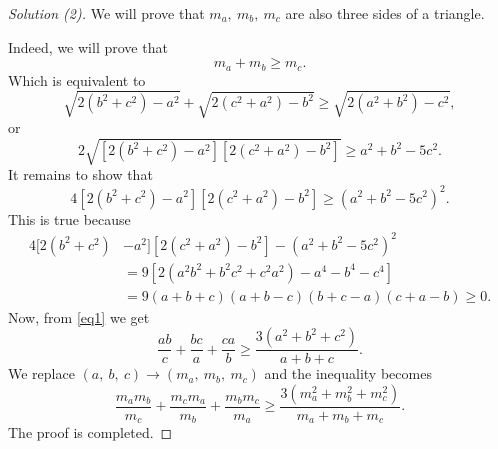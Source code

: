 \documentclass[12pt,a4paper]{book}
\begin{document}

\begin{proof}[\cmss\problemColor Solution (2)]
We will prove that $m_a, \ m_b, \ m_c$ are also three sides of a triangle. 

Indeed, we will prove that
\[m_a + m_b \geqslant m_c.\]
Which is equivalent to
\[\sqrt{2(b^2+c^2)-a^2} +\sqrt{2(c^2+a^2)-b^2}\geqslant \sqrt{2(a^2+b^2)-c^2},\]
or
\[2\sqrt{[2(b^2+c^2)-a^2][2(c^2+a^2)-b^2]} \ge a^2+b^2-5c^2.\]
It remains to show that
\[4[2(b^2+c^2)-a^2][2(c^2+a^2)-b^2] \ge (a^2+b^2-5c^2)^2.\]
This is true because
\[\begin{aligned}
4[2(b^2+c^2) &- a^2][2(c^2+a^2)-b^2] - (a^2+b^2-5c^2)^2 \\
& = 9 \left[2(a^2b^2+b^2c^2+c^2a^2) - a^4 - b^4 - c^4\right] \\ 
& = 9(a+b+c)(a+b-c)(b+c-a)(c+a-b) \ge 0.
\end{aligned}\]
Now, from \eqref{eq1} we get
\[\frac{ab}{c}+\frac{bc}{a}+\frac{ca}{b} \ge \frac{3(a^2+b^2+c^2)}{a+b+c}.\]
We replace $(a, \ b, \ c) \to (m_a,\ m_b,\ m_c)$ and the inequality becomes
\[\frac{m_am_b}{m_c}+\frac{m_cm_a}{m_b}+\frac{m_bm_c}{m_a} \ge \frac{3(m_a^2+m_b^2+m_c^2)}{m_a+m_b+m_c}.\]
The proof is completed.
\end{proof}
\end{document}
